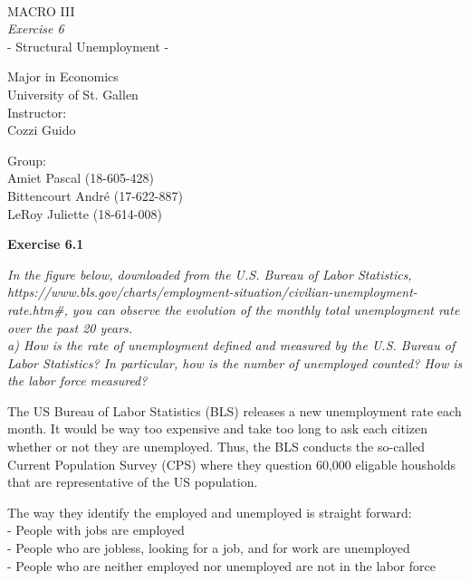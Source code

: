\documentclass[11pt]{article} %
\begin{document}
\thispagestyle{empty}
\ \vspace{1.0cm}
\begin{center}
{\LARGE
MACRO III \\
\textit{Exercise 6} \\
{\small - Structural Unemployment -}\\[2cm]
}

{
Major in Economics \\
{University of St. Gallen} \\ [2cm]
Instructor:\\
Cozzi Guido \\[2cm]
}

{
Group:\\
Amiet Pascal (18-605-428)\\
Bittencourt André (17-622-887)\\
LeRoy Juliette (18-614-008)\\
}
\end{center}

\pagebreak

\textbf{\Large{Exercise 6.1}}

\textit{In the figure below, downloaded from the U.S. Bureau of Labor Statistics,
https://www.bls.gov/charts/employment-situation/civilian-unemployment-rate.htm#,
you can observe the evolution of the monthly total unemployment rate over
the past 20 years.}\\

\textit{a) How is the rate of unemployment defined and measured by the U.S.
Bureau of Labor Statistics? In particular, how is the number of unemployed counted? How is the labor force measured?}\bigskip

The US Bureau of Labor Statistics (BLS) releases a new unemployment rate each month. It would be way too expensive and take too long to ask each citizen whether or not they are unemployed. Thus, the BLS conducts the so-called Current Population Survey (CPS) where they question 60,000 eligable housholds that are representative of the US population.\par 

The way they identify the employed and unemployed is straight forward:\\
- People with jobs are employed\\
- People who are jobless, looking for a job, and for work are unemployed\\
- People who are neither employed nor unemployed are not in the labor force\par
\end{document}
